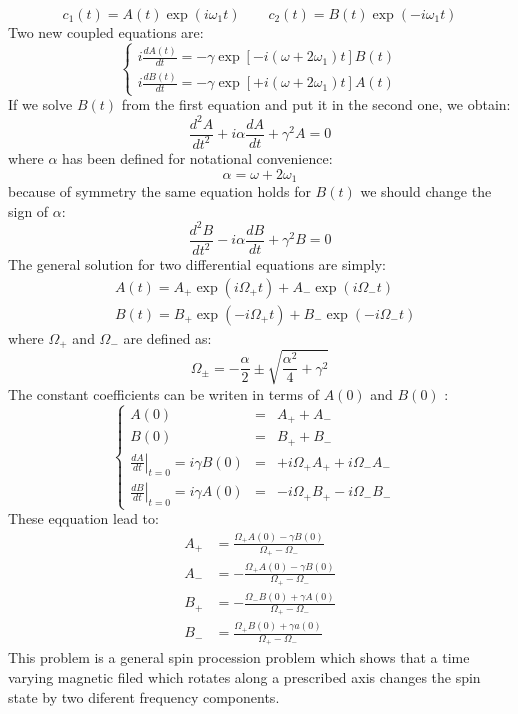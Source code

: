 \begin{homeworkProblem}
\begin{equation}
c_1(t)=A(t)\exp(i\omega_1 t)\qquad  c_2(t)=B(t)\exp(-i\omega_1 t)
\end{equation}   
Two new coupled equations are:  
\begin{equation}
\left\{
\begin{array}{l}
i\frac{dA(t)}{dt}=-\gamma \exp\left[-i(\omega +2\omega_1)t\right]B(t)\\
i\frac{dB(t)}{dt}=-\gamma \exp\left[+i(\omega +2\omega_1)t\right] A(t)
\end{array}\right.
\end{equation}
If we solve $B(t)$ from the first equation and put it in the second one, we obtain:
\begin{equation}
\frac{d^2A}{dt^2}+i\alpha \frac{dA}{dt}+\gamma^2 A=0
\end{equation}
where $\alpha$ has been defined for notational convenience:
\begin{equation}
\alpha=\omega+2\omega_1
\end{equation}
because of symmetry the same equation holds for $B(t)$ we should change the sign of $\alpha$:
\begin{equation}
\frac{d^2B}{dt^2}-i\alpha \frac{dB}{dt}+\gamma^2 B=0
\end{equation}  
The general solution for two differential equations are simply:
\begin{align}
&A(t)=A_{+} \exp(i\Omega_+t)+A_-\exp(i\Omega_-t)\\
&B(t)=B_+\exp(-i\Omega_+t)+B_-\exp(-i\Omega_-t)
\end{align}
where $\Omega_+$ and $\Omega_-$ are defined as:
\begin{equation}
\Omega_\pm=-\frac{\alpha}{2}\pm\sqrt{\frac{\alpha^2}{4}+\gamma^2}
\end{equation}
The constant coefficients can be writen in terms of $A(0)$ and $B(0)$ :
\begin{equation}
\left\{
\begin{array}{rcl}
A(0) &=&A_++A_- &\\
B(0) &=&B_++B_- &\\
\left.\frac{dA}{dt}\right|_{t=0}=i\gamma B(0)&=&+i\Omega_+A_++i\Omega_-A_-\\
\left.\frac{dB}{dt}\right|_{t=0}=i\gamma A(0)&=&-i\Omega_+B_+-i\Omega_-B_-
\end{array}\right.
\end{equation}
These eqquation lead to:
\begin{align}
A_+&=\frac{\Omega_+ A(0)-\gamma B(0)}{\Omega_+-\Omega_-}\\
A_-&=-\frac{\Omega_+ A(0)-\gamma B(0)}{\Omega_+-\Omega_-}\\
B_+&=-\frac{\Omega_- B(0)+\gamma A(0)}{\Omega_+-\Omega_-}\\
B_-&=\frac{\Omega_+ B(0)+\gamma a(0)}{\Omega_+-\Omega_-}
\end{align}
This problem is a general spin procession problem which shows that a time varying magnetic filed which rotates along a prescribed axis changes the spin state by two diferent frequency components. 
\end{homeworkProblem}